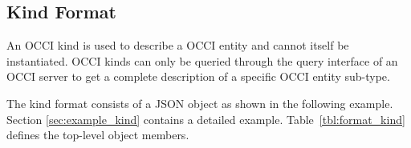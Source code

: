 \documentclass[10pt,a4paper]{article}
\begin{document}
%
%

\subsection{Kind Format}
\label{sec:format_kind}

An OCCI kind is used to describe a OCCI entity and cannot itself be 
instantiated. OCCI kinds can only be queried through the query interface 
of an OCCI server to get a complete description of a specific OCCI entity sub-type.

The kind format consists of a JSON object as shown in the
following example. Section \ref{sec:example_kind} contains a detailed example.
Table~\ref{tbl:format_kind} defines the top-level object members.
\end{document}
